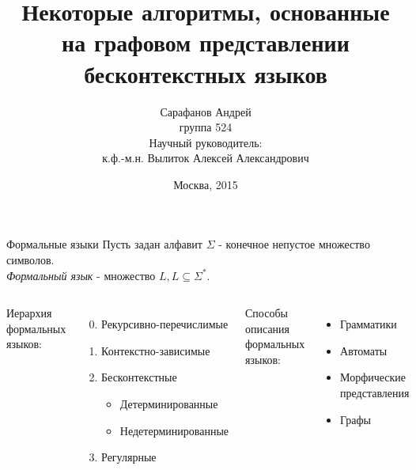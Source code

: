 \documentclass{beamer}
\title []{Некоторые алгоритмы, основанные на графовом представлении бесконтекстных языков}
\author {Сарафанов Андрей \\ \small{группа 524\\ \vspace{1cm}Научный руководитель:\\
  к.ф.-м.н. Вылиток Алексей Александрович\\}}
\date {\footnotesize{Москва, 2015}}
\begin{document}
\begin{frame}
  \titlepage
\end{frame}

\begin{frame} {Формальные языки}
Пусть задан алфавит $\Sigma$ - конечное непустое множество символов.\\
\textit{Формальный язык} - множество $L, L\subseteq \Sigma^*$.
\vspace{5mm} %
\begin{columns}
    Иерархия формальных языков:
    \begin{enumerate}
      \setcounter{enumi}{-1}
      \item Рекурсивно-перечислимые
      \item Контекстно-зависимые
      \item Бесконтекстные
        \begin{itemize}
          \item Детерминированные
          \item Недетерминированные
        \end{itemize}
      \item Регулярные
    \end{enumerate}
    Способы описания формальных языков:
    \begin{itemize}
      \item Грамматики
      \item Автоматы
      \item Морфические представления
      \item Графы
    \end{itemize}
\end{columns}
\end{frame}
\end{document}
